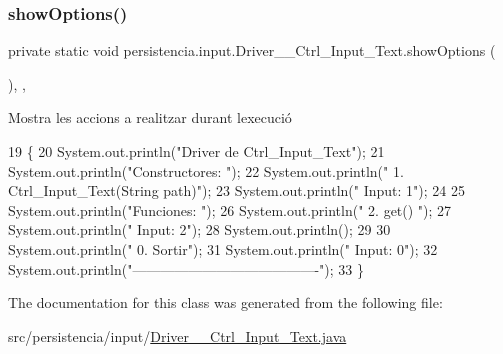 \subsubsection{\texorpdfstring{show\+Options()}{showOptions()}}
{\footnotesize\ttfamily private static void persistencia.\+input.\+Driver\+\_\+\+\_\+\+Ctrl\+\_\+\+Input\+\_\+\+Text.\+show\+Options (\begin{DoxyParamCaption}{ }\end{DoxyParamCaption})\hspace{0.3cm}{\ttfamily [inline]}, {\ttfamily [static]}, {\ttfamily [private]}}



Mostra les accions a realitzar durant l\textquotesingle{}execució 


\begin{DoxyCode}
19                                      \{
20         System.out.println(\textcolor{stringliteral}{"Driver de Ctrl\_Input\_Text"});
21         System.out.println(\textcolor{stringliteral}{"Constructores: "});
22         System.out.println(\textcolor{stringliteral}{"     1. Ctrl\_Input\_Text(String path)"});
23         System.out.println(\textcolor{stringliteral}{"     Input: 1"});
24 
25         System.out.println(\textcolor{stringliteral}{"Funciones: "});
26         System.out.println(\textcolor{stringliteral}{"     2. get() "});
27         System.out.println(\textcolor{stringliteral}{"     Input: 2"});
28         System.out.println();
29 
30         System.out.println(\textcolor{stringliteral}{"     0. Sortir"});
31         System.out.println(\textcolor{stringliteral}{"     Input: 0"});
32         System.out.println(\textcolor{stringliteral}{"----------------------------------------"});
33     \}
\end{DoxyCode}


The documentation for this class was generated from the following file\+:\begin{DoxyCompactItemize}
\item 
src/persistencia/input/\hyperlink{Driver____Ctrl__Input__Text_8java}{Driver\+\_\+\+\_\+\+Ctrl\+\_\+\+Input\+\_\+\+Text.\+java}\end{DoxyCompactItemize}
